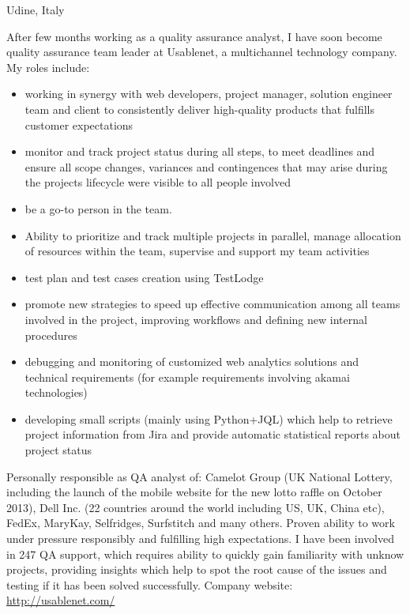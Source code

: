 \documentclass[10pt,a4paper]{moderncv}   %
\begin{document}
   {Udine, Italy}{}{After few months working as a quality assurance analyst, I
      have soon become
   quality assurance team leader at Usablenet, a multichannel technology
   company. 
   My roles include:
   \begin{itemize}
\item 
  working in synergy with  web
   developers, project manager, solution engineer team and client to
   consistently deliver high-quality
   products that fulfills customer expectations 
\item monitor and track project status during all steps, to meet deadlines
   and ensure all scope changes,
 variances and contingences that may arise during the 
 projects lifecycle were visible to all people involved
 \item  be a go-to person in the team.
 \item 
   Ability to prioritize and track multiple projects in parallel,
    manage  allocation of resources within the team, supervise and support my team
    activities
\item test plan and test cases creation using TestLodge
\item promote new strategies to speed up effective communication among all
   teams involved in the project,
   improving workflows and defining new internal procedures
\item debugging and monitoring of customized web analytics solutions and 
technical requirements (for example requirements involving
   akamai technologies)
   \item developing small scripts (mainly using Python+JQL) which help to retrieve project
 information from Jira and provide automatic statistical reports about project status
 \end{itemize} 
   Personally responsible as QA analyst of:
   Camelot Group (UK National Lottery, including the
   launch of the mobile website for the new lotto raffle on October 2013), Dell Inc. (22 countries
   around the world including US, UK, China etc), FedEx,
   MaryKay, Selfridges, Surfstitch and many others.
   Proven ability to work under pressure responsibly and fulfilling high
   expectations.
I have been involved in 247 QA support, which requires ability to quickly gain
familiarity with unknow projects, providing insights which help to spot the root
cause of the issues and testing if it has
been solved successfully.
Company website: \url{http://usablenet.com/}}
\end{document}
